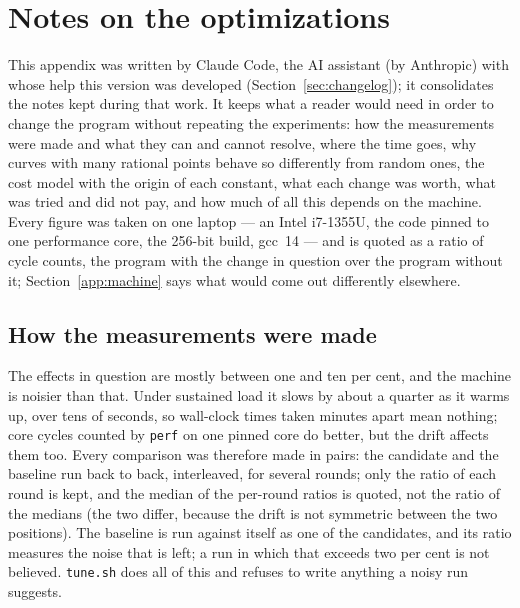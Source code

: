 \documentclass[12pt,a4paper,oneside]{amsart}
\begin{document}

\appendix

\section{Notes on the optimizations}\label{app:notes}

This appendix was written by Claude Code, the AI assistant (by Anthropic)
with whose help this version was developed (Section~\ref{sec:changelog}); it
consolidates the notes kept during that work. It keeps what a reader would
need in order to change the program without repeating the experiments: how
the measurements were made and what they can and cannot resolve, where the
time goes, why curves with many rational points behave so differently from
random ones, the cost model with the origin of each constant, what each
change was worth, what was tried and did not pay, and how much of all this
depends on the machine. Every figure was taken on one laptop --- an Intel
i7-1355U, the code pinned to one performance core, the 256-bit build,
gcc~14 --- and is quoted as a ratio of cycle counts, the program with the
change in question over the program without it;
Section~\ref{app:machine} says what would come out differently elsewhere.

\subsection{How the measurements were made}\label{app:measure}

The effects in question are mostly between one and ten per cent, and the
machine is noisier than that. Under sustained load it slows by about a
quarter as it warms up, over tens of seconds, so wall-clock times taken
minutes apart mean nothing; core cycles counted by \texttt{perf} on one
pinned core do better, but the drift affects them too. Every comparison was
therefore made in pairs: the candidate and the baseline run back to back,
interleaved, for several rounds; only the ratio of each round is kept, and
the median of the per-round ratios is quoted, not the ratio of the medians
(the two differ, because the drift is not symmetric between the two
positions). The baseline is run against itself as one of the candidates,
and its ratio measures the noise that is left; a run in which that exceeds
two per cent is not believed. \texttt{tune.sh} does all of this and refuses
to write anything a noisy run suggests.
\end{document}
